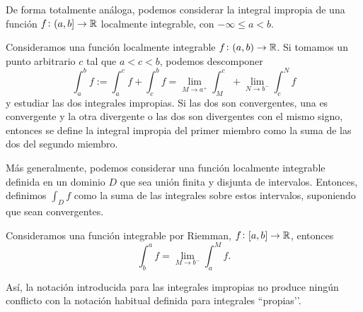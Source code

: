 \begin{obs}
    De forma totalmente análoga, podemos considerar la integral impropia de una
    función $f \colon (a,b] \to \mathbb{R}$ localmente integrable, con $-\infty \leq a
    < b$.
\end{obs}

\begin{defi}
    Consideramos una función localmente integrable $f \colon (a,b) \to \mathbb{R}$. Si
    tomamos un punto arbitrario $c$ tal que $a < c < b$, podemos descomponer
    \[
        \int^b_a f := \int^c_a f + \int^b_c f = \lim_{M \to a^+} \int^c_M +
        \lim_{N \to b^-} \int^N_c f
    \]
    y estudiar las dos integrales impropias. Si las dos son convergentes, una
    es convergente y la otra divergente o las dos son divergentes con el mismo
    signo, entonces se define la integral impropia del primer miembro como la
    suma de las dos del segundo miembro.
\end{defi}
\begin{obs*}
    Más generalmente, podemos considerar una función localmente integrable definida
    en un dominio $D$ que sea unión finita y disjunta de intervalos. Entonces,
    definimos $\int_D f$ como la suma de las integrales sobre estos intervalos,
    suponiendo que sean convergentes.
\end{obs*}

\begin{prop}
    Consideramos una función integrable por Riemman, $f \colon [a,b] \to \mathbb{R}$,
    entonces
    \[
        \int^a_b f = \lim_{M \to b^-} \int^M_a f.
    \]
\end{prop}

\begin{obs*}
    Así, la notación introducida para las integrales impropias no produce ningún
    conflicto con la notación habitual definida para integrales ``propias’’.
\end{obs*}

